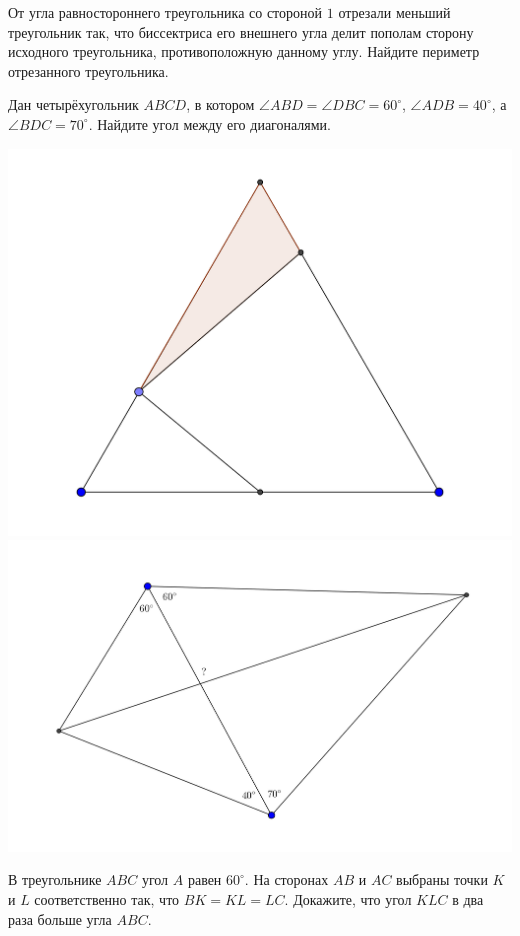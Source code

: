 \begin{problems}
\item От угла равностороннего треугольника со стороной $1$ отрезали меньший треугольник так, что биссектриса его внешнего угла делит пополам сторону исходного треугольника, противоположную данному углу. Найдите периметр отрезанного треугольника.

\item Дан четырёхугольник $ABCD$, в котором $\angle ABD=\angle DBC=60^{\circ}$, $\angle ADB=40^{\circ}$, а $\angle BDC=70^{\circ}$. Найдите угол между его диагоналями.

\begin{center}
	\includegraphics[width=.45\textwidth]{incen03}
	\includegraphics[width=.45\textwidth]{incen04}
\end{center}

\item В треугольнике $ABC$ угол $A$ равен $60^{\circ}$. На сторонах $AB$ и $AC$ выбраны точки $K$ и $L$ соответственно так, что $BK = KL = LC$. Докажите, что угол $KLC$ в два раза больше угла $ABC$.


\end{problems}